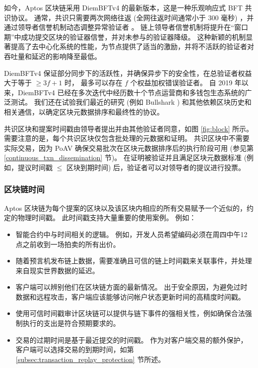 \documentclass{article}
\begin{document}
如今，Aptos 区块链采用 DiemBFTv4 \cite{diembft_v4} 的最新版本，这是一种乐观响应式 BFT 共识协议。 通常，共识只需要两次网络往返 (全网往返时间通常小于 300 毫秒) ，并通过领导者信誉机制动态调整异常验证者 \cite{be_aware}。 链上领导者信誉机制将提升在“窗口期”中成功提交区块的验证器信誉，并对未参与的验证器降级。 这种新颖的机制显著提高了去中心化系统的性能，为节点提供了适当的激励，并将不活跃的验证者对吞吐量和延迟的影响降至最低。

DiemBFTv4 保证部分同步下的活跃性，并确保异步下的安全性，在总验证者权益大于等于 $\geq 3f+1$ 时， 最多可以存在 $f$ 个权益加权错误验证者。 自 2019 年以来，DiemBFTv4 已经在多次迭代中经历数十个节点运营商和多钱包生态系统的广泛测试。 我们还在试验我们最近的研究 (例如 Bullshark \cite{bullshark}) 和其他依赖区块历史和相关通信，以确定区块元数据排序和最终性的协议。

共识区块和提案时间戳由领导者提出并由其他验证者同意，如图 \ref{fig:block} 所示。 需要注意的是，每个共识区块仅包含批处理的元数据和证明。 共识区块中不需要实际交易，因为 PoAV 确保交易批次在区块元数据排序后的执行阶段可用 (参见第 \ref{continuous_txn_dissemination} 节)。 在证明被验证并且满足区块元数据标准 (例如，提议时间戳 $\le$ 区块到期时间) 后，验证者可以对领导者的提议进行投票。

\subsubsection{区块链时间}
\label{subsubsec:blockchain_time}

Aptos 区块链为每个提案的区块以及该区块内相应的所有交易赋予一个近似的，约定的物理时间戳。 此时间戳支持大量重要的使用案例。 例如：

\begin{itemize}
\item 智能合约中与时间相关的逻辑。 例如，开发人员希望编码必须在周四中午12点之前收到一场拍卖的所有出价。
\item 随着预言机发布链上数据，需要准确且可信的链上时间戳来关联事件，并处理来自现实世界数据的延迟。

\item 客户端可以辨别他们在区块链方面的最新情况。 出于安全原因，为避免过时数据和远程攻击，客户端应该能够访问帐户状态更新时间的高精度时间戳。

\item 使用可信时间戳审计区块链可以提供与链下事件的强相关性，例如确保合法强制执行的支出是符合预期要求的。
\item 交易的过期时间是基于最近提交的时间戳。 作为对客户端交易的额外保护，客户端可以选择交易的到期时间，如第 \ref{subsec:transaction_replay_protection} 节所述。

\end{itemize}
\end{document}
